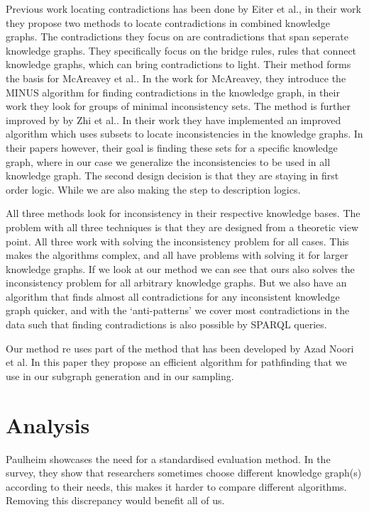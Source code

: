 \documentclass[11pt,letterpaper ,oneside ]{book}
\begin{document}
Previous work locating contradictions has been done by Eiter et al.\cite{Eiter:2010}, in their work they propose two methods to locate contradictions in combined knowledge graphs. The contradictions they focus on are contradictions that span seperate knowledge graphs. They specifically focus on the bridge rules, rules that connect knowledge graphs, which can bring contradictions to light. Their method forms the basis for McAreavey et al.\cite{McAreavey:2014}. In the work for McAreavey, they introduce the MINUS algorithm for finding contradictions in the knowledge graph, in their work they look for groups of minimal inconsistency sets. The method is further improved by by Zhi et al.\cite{Zhi:2015}. In their work they have implemented an improved algorithm which uses subsets to locate inconsistencies in the knowledge graphs. In their papers however, their goal is finding these sets for a specific knowledge graph, where in our case we generalize the inconsistencies to be used in all knowledge graph. The second design decision is that they are staying in first order logic. While we are also making the step to description logics.

All three methods look for inconsistency in their respective knowledge bases. The problem with all three techniques is that they are designed from a theoretic view point. All three work with solving the inconsistency problem for all cases. This makes the algorithms complex, and all have problems with solving it for larger knowledge graphs. If we look at our method we can see that ours also solves the inconsistency problem for all arbitrary knowledge graphs. But we also have an algorithm that finds almost all contradictions for any inconsistent knowledge graph quicker, and with the `anti-patterns' we cover most contradictions in the data such that finding contradictions is also possible by SPARQL queries.

Our method re uses part of the method that has been developed by Azad Noori et al\cite{Noori:2015}. In this paper they propose an efficient algorithm for pathfinding that we use in our subgraph generation and in our sampling.

\section{Analysis}
Paulheim \cite{HeikoP:2016} showcases the need for a standardised evaluation method. In the survey, they show that researchers sometimes choose different knowledge graph(s) according to their needs, this makes it harder to compare different algorithms. Removing this discrepancy would benefit all of us.
\end{document}
